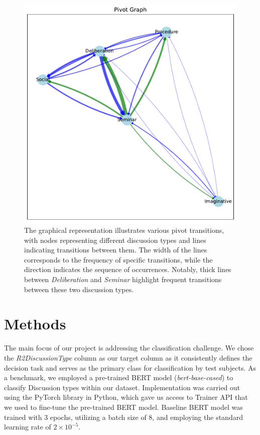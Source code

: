 \documentclass[fleqn,moreauthors,10pt]{ds_report}
\begin{document}
\begin{figure}[ht!]\centering
	\includegraphics[scale=0.3]{fig/pivot_graph.pdf}
	\caption{The graphical representation illustrates various pivot transitions, with nodes representing different discussion types and lines indicating transitions between them. The width of the lines corresponds to the frequency of specific transitions, while the direction indicates the sequence of occurrences. Notably, thick lines between \textit{Deliberation} and \textit{Seminar} highlight frequent transitions between these two discussion types.}
	\label{fig:pivot_graph}
\end{figure}
\fi



\section*{Methods}

The main focus of our project is addressing the classification challenge. We chose the \textit{R2DiscussionType} column as our target column as it consistently defines the decision task and serves as the primary class for classification by test subjects. As a benchmark, we employed a pre-trained BERT model (\textit{bert-base-cased}) to classify Discussion types within our dataset. Implementation was carried out using the PyTorch library in Python, which gave us access to Trainer API that we used to fine-tune the pre-trained BERT model. Baseline BERT model was trained with 3 epochs, utilizing a batch size of 8, and employing the standard learning rate of $2 \times 10^{-5}$.
\end{document}
